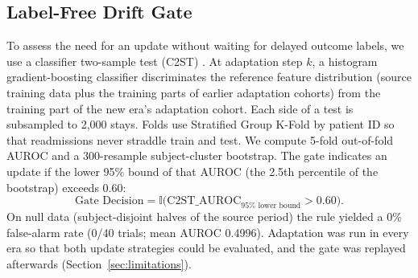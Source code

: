 \documentclass[10pt,a4paper,twocolumn]{article}
\begin{document}
	\subsection{Label-Free Drift Gate}
	\label{sec:gate_method}
	To assess the need for an update without waiting for delayed outcome labels, we use a classifier two-sample test (C2ST) \citep{lopez2017c2st}. At adaptation step $k$, a histogram gradient-boosting classifier discriminates the reference feature distribution (source training data plus the training parts of earlier adaptation cohorts) from the training part of the new era's adaptation cohort. Each side of a test is subsampled to 2,000 stays. Folds use Stratified Group K-Fold by patient ID so that readmissions never straddle train and test. We compute 5-fold out-of-fold AUROC and a 300-resample subject-cluster bootstrap. The gate indicates an update if the lower 95\% bound of that AUROC (the 2.5th percentile of the bootstrap) exceeds 0.60:
	\begin{equation}
		\text{Gate Decision} = \mathbb{I}\bigl(\text{C2ST\_AUROC}_{95\%\text{ lower bound}} > 0.60\bigr).
	\end{equation}
	On null data (subject-disjoint halves of the source period) the rule yielded a 0\% false-alarm rate (0/40 trials; mean AUROC 0.4996). Adaptation was run in every era so that both update strategies could be evaluated, and the gate was replayed afterwards (Section~\ref{sec:limitations}).
	
\end{document}
